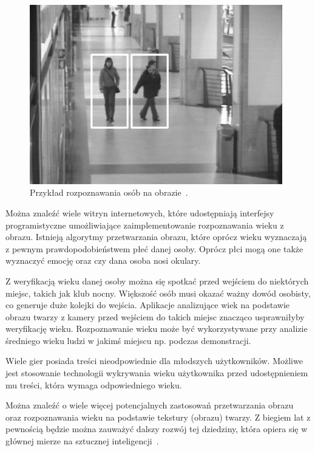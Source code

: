 \documentclass[a4paper,twoside,12pt]{book}
\begin{document}
    \begin{figure}[h!]
        \centering
        \includegraphics[width=11cm]{Obrazy/person-detection.png}
        \caption{Przykład rozpoznawania osób na obrazie~\cite{rozpoznawanieObiektow}.}
        \label{fig.rozpoznawanieObiektow}
    \end{figure}

    Można znaleźć wiele witryn internetowych, które udostępniają interfejsy programistyczne umożliwiające zaimplementowanie
    rozpoznawania wieku z obrazu.
    Istnieją algorytmy przetwarzania obrazu, które oprócz wieku wyznaczają z pewnym prawdopodobieństwem płeć danej osoby.
    Oprócz płci mogą one także wyznaczyć emocję oraz czy dana osoba nosi okulary.

    Z weryfikacją wieku danej osoby można się spotkać przed wejściem do niektórych miejsc, takich jak
    klub nocny.
    Większość osób
    musi okazać ważny dowód osobisty,
    co generuje duże kolejki do wejścia.
    Aplikacje analizujące wiek na podstawie obrazu twarzy z kamery przed wejściem
    do takich miejsc znacząco usprawniłyby weryfikację wieku.
    Rozpoznawanie wieku może być wykorzystywane przy analizie średniego wieku ludzi w jakimś miejscu np.
    podczas demonstracji.

    Wiele gier posiada treści nieodpowiednie dla młodszych użytkowników.
    Możliwe jest stosowanie technologii wykrywania
    wieku użytkownika przed udostępnieniem mu treści, która wymaga odpowiedniego wieku.

    Można znaleźć o wiele więcej potencjalnych zastosowań przetwarzania obrazu oraz rozpoznawania wieku na podstawie
    tekstury (obrazu) twarzy.
    Z biegiem lat z pewnością będzie można zauważyć dalszy rozwój tej dziedziny, która
    opiera się w głównej mierze na sztucznej inteligencji~\cite{computerVision}.
\end{document}
